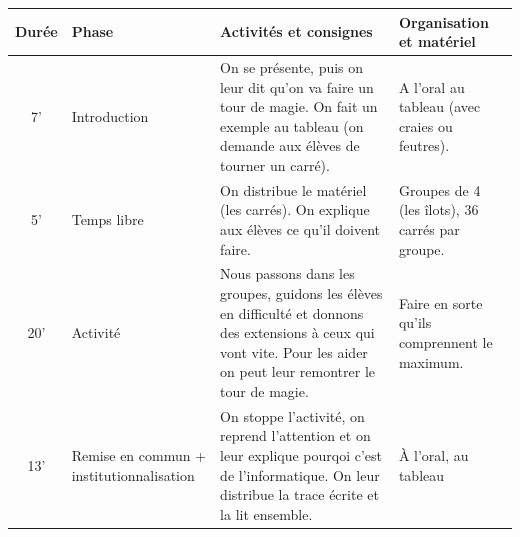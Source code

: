 \documentclass[12pt, a4paper]{article}
\begin{document}
	\begin{longtable}{c|m{3.9cm}|m{8.4cm}|m{2.4cm}}		\textbf{Durée} & \textbf{Phase} & \textbf{Activités et consignes} & \textbf{Organisation et matériel} \\ \hline\hline
		
		7' &
		
		Introduction
		
		&
		
		On se présente, puis on leur dit qu'on va faire un tour de magie. On fait un exemple au tableau (on demande aux élèves de tourner un carré).
		
		& 
		
		A l'oral au tableau (avec craies ou feutres).	

		\\ \hline

		5' &

		Temps libre

		&

		On distribue le matériel (les carrés). On explique aux élèves ce qu'il doivent faire.

		&

		Groupes de 4 (les îlots), 36 carrés par groupe.
		
		\\ \hline
		
		20'
		
		&
		
		Activité
		
		& 
		
		Nous passons dans les groupes, guidons les élèves en difficulté et donnons des extensions à ceux qui vont vite. Pour les aider on peut leur remontrer le tour de magie.

		
		& Faire en sorte qu'ils comprennent le maximum.
		
		\\ \hline
		
		13' &
		
		Remise en commun + institutionnalisation
		
		&
		
		On stoppe l'activité, on reprend l'attention et on leur explique pourqoi c'est de l'informatique. On leur distribue la trace écrite et la lit ensemble.
		
		& 
		
		À l'oral, au tableau		
	
		\\ \hline
		
	\end{longtable}
	
\end{document}
